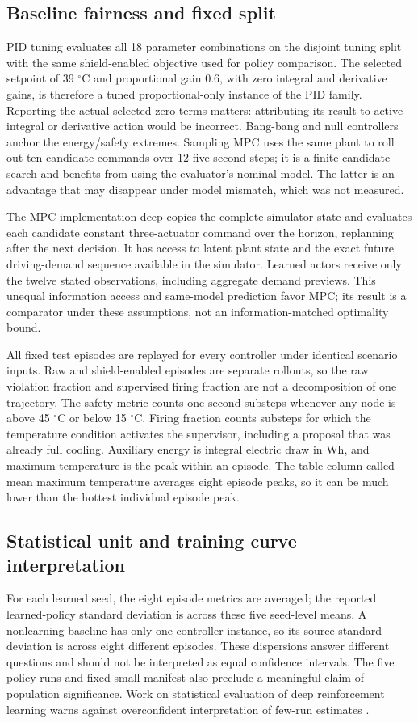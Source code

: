 \documentclass[conference]{IEEEtran}
\begin{document}
\subsection{Baseline fairness and fixed split}
PID tuning evaluates all 18 parameter combinations on the disjoint tuning split with the same shield-enabled objective used for policy comparison. The selected setpoint of 39 $^{\circ}$C and proportional gain 0.6, with zero integral and derivative gains, is therefore a tuned proportional-only instance of the PID family. Reporting the actual selected zero terms matters: attributing its result to active integral or derivative action would be incorrect. Bang-bang and null controllers anchor the energy/safety extremes. Sampling MPC uses the same plant to roll out ten candidate commands over 12 five-second steps; it is a finite candidate search and benefits from using the evaluator's nominal model. The latter is an advantage that may disappear under model mismatch, which was not measured.

The MPC implementation deep-copies the complete simulator state and evaluates each candidate constant three-actuator command over the horizon, replanning after the next decision. It has access to latent plant state and the exact future driving-demand sequence available in the simulator. Learned actors receive only the twelve stated observations, including aggregate demand previews. This unequal information access and same-model prediction favor MPC; its result is a comparator under these assumptions, not an information-matched optimality bound.

All fixed test episodes are replayed for every controller under identical scenario inputs. Raw and shield-enabled episodes are separate rollouts, so the raw violation fraction and supervised firing fraction are not a decomposition of one trajectory. The safety metric counts one-second substeps whenever any node is above 45 $^{\circ}$C or below 15 $^{\circ}$C. Firing fraction counts substeps for which the temperature condition activates the supervisor, including a proposal that was already full cooling. Auxiliary energy is integral electric draw in Wh, and maximum temperature is the peak within an episode. The table column called mean maximum temperature averages eight episode peaks, so it can be much lower than the hottest individual episode peak.

\subsection{Statistical unit and training curve interpretation}
For each learned seed, the eight episode metrics are averaged; the reported learned-policy standard deviation is across these five seed-level means. A nonlearning baseline has only one controller instance, so its source standard deviation is across eight different episodes. These dispersions answer different questions and should not be interpreted as equal confidence intervals. The five policy runs and fixed small manifest also preclude a meaningful claim of population significance. Work on statistical evaluation of deep reinforcement learning warns against overconfident interpretation of few-run estimates \cite{r14}.
\end{document}

